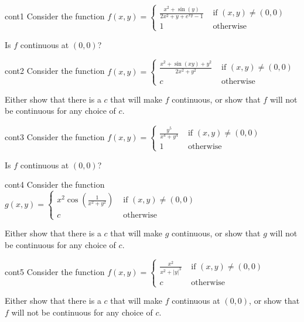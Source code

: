\begin{problem}{cont1}
Consider the function $f(x,y) = \left\{
		\begin{array}{ll}
			\frac{x^2 + \sin(y)}{2x^2 + y +e^{xy}-1} & \text{ if } (x,y) \neq (0,0) \\
			1 & \text{ otherwise } 
		\end{array}
		\right.$
		
		Is $f$ continuous at $(0,0)$?
\end{problem}



\begin{problem}{cont2}
Consider the function  $f(x,y) = \left\{
		\begin{array}{ll}
			\frac{x^2  +\sin(xy)+y^2}{2x^2 + y^2} & \text{ if } (x,y) \neq (0,0) \\
			c & \text{ otherwise } 
		\end{array}
		\right.$
		
		Either show that there is a $c$ that will make $f$ continuous, or show that $f$ will not be continuous for any choice of $c$.
\end{problem}

\begin{problem}{cont3}
Consider the function $f(x,y) = \left\{
		\begin{array}{ll}
			\frac{y^5}{x^4 + y^4} & \text{ if } (x,y) \neq (0,0) \\
			1 & \text{ otherwise } 
		\end{array}
		\right.$
		
		Is $f$ continuous at $(0,0)$?
\end{problem}

\begin{problem}{cont4}
Consider the function  $g(x,y) = \left\{
		\begin{array}{ll}
			x^2\cos(\frac{1}{x^2 + y^2}) & \text{ if } (x,y) \neq (0,0) \\
			c & \text{ otherwise } 
		\end{array}
		\right.$
		
		Either show that there is a $c$ that will make $g$ continuous, or show that $g$ will not be continuous for any choice of $c$.
\end{problem}

\begin{problem}{cont5}
Consider the function  $f(x,y) = \left\{
		\begin{array}{ll}
			\frac{x^2}{x^2 + |y|^3} & \text{ if } (x,y) \neq (0,0) \\
			c & \text{ otherwise } 
		\end{array}
		\right.$
		
		Either show that there is a $c$ that will make $f$ continuous at $(0,0)$, or show that $f$ will not be continuous for any choice of $c$.
\end{problem}


